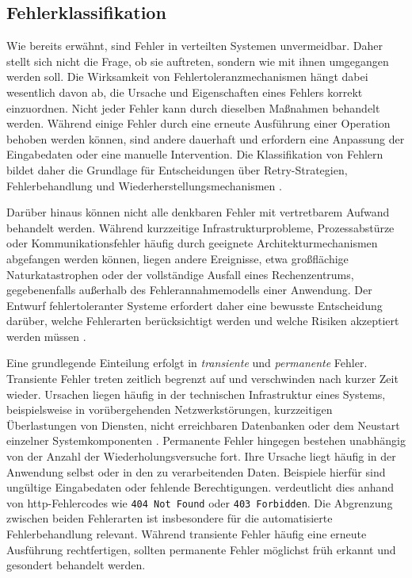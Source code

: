 \subsection{Fehlerklassifikation}
\label{subsec:fehlerklassifikation}
Wie bereits erwähnt, sind Fehler in verteilten Systemen unvermeidbar.
Daher stellt sich nicht die Frage, ob sie auftreten, sondern wie mit ihnen umgegangen werden soll.
Die Wirksamkeit von Fehlertoleranzmechanismen hängt dabei wesentlich davon ab, die Ursache und Eigenschaften eines Fehlers korrekt einzuordnen.
Nicht jeder Fehler kann durch dieselben Maßnahmen behandelt werden.
Während einige Fehler durch eine erneute Ausführung einer Operation behoben werden können, sind andere dauerhaft und erfordern eine
Anpassung der Eingabedaten oder eine manuelle Intervention.
Die Klassifikation von Fehlern bildet daher die Grundlage für Entscheidungen über Retry-Strategien, Fehlerbehandlung und
Wiederherstellungsmechanismen \parencite[Kap.~3 Abschnitt \glqq Should You Always Retry?\grqq]{newman_building_2026}.

Darüber hinaus können nicht alle denkbaren Fehler mit vertretbarem Aufwand behandelt werden.
Während kurzzeitige Infrastrukturprobleme, Prozessabstürze oder Kommunikationsfehler häufig durch geeignete Architekturmechanismen
abgefangen werden können, liegen andere Ereignisse, etwa großflächige Naturkatastrophen oder der vollständige Ausfall eines
Rechenzentrums, gegebenenfalls außerhalb des Fehlerannahmemodells einer Anwendung.
Der Entwurf fehlertoleranter Systeme erfordert daher eine bewusste Entscheidung darüber, welche Fehlerarten berücksichtigt
werden und welche Risiken akzeptiert werden müssen \parencite[Kap.~1 Abschnitt \glqq Reliability\grqq]{kleppmann_designing_2017}.

Eine grundlegende Einteilung erfolgt in \textit{transiente} und \textit{permanente} Fehler.
Transiente Fehler treten zeitlich begrenzt auf und verschwinden nach kurzer Zeit wieder.
Ursachen liegen häufig in der technischen Infrastruktur eines Systems, beispielsweise in vorübergehenden Netzwerkstörungen,
kurzzeitigen Überlastungen von Diensten, nicht erreichbaren Datenbanken oder dem Neustart einzelner Systemkomponenten
\parencite[Kap.~3 Abschnitt \glqq Should You Always Retry?\grqq]{newman_building_2026}.
Permanente Fehler hingegen bestehen unabhängig von der Anzahl der Wiederholungsversuche fort.
Ihre Ursache liegt häufig in der Anwendung selbst oder in den zu verarbeitenden Daten.
Beispiele hierfür sind ungültige Eingabedaten oder fehlende Berechtigungen.
\textcite[Kap.~3 Abschnitt \glqq Should You Always Retry?\grqq]{newman_building_2026} verdeutlicht dies anhand von \gls{http}-Fehlercodes
wie \texttt{404 Not Found} oder \texttt{403 Forbidden}.
Die Abgrenzung zwischen beiden Fehlerarten ist insbesondere für die automatisierte Fehlerbehandlung relevant.
Während transiente Fehler häufig eine erneute Ausführung rechtfertigen, sollten permanente Fehler möglichst früh erkannt
und gesondert behandelt werden.

